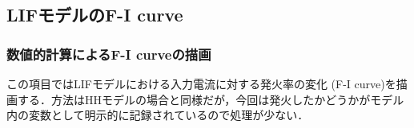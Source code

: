 \subsection{LIFモデルのF-I curve}
\subsubsection{数値的計算によるF-I curveの描画}
この項目ではLIFモデルにおける入力電流に対する発火率の変化 (F-I curve)を描画する．方法はHHモデルの場合と同様だが，今回は発火したかどうかがモデル内の変数として明示的に記録されているので処理が少ない．
